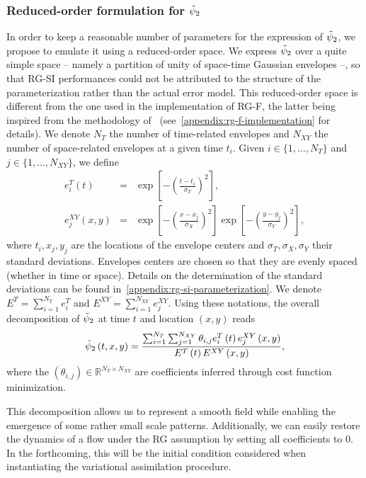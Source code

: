 \documentclass[
  draft
]{agujournal2025}
\begin{document}
\subsubsection{Reduced-order formulation for $\tilde{\sf}_2$}\label{sec:ROpsi2}
In order to keep a reasonable number of parameters for the expression of $\tilde{\sf}_2$, we propose to emulate it using a reduced-order space.
We express $\tilde{\sf}_2$ over a quite simple space -- namely a partition of unity of space-time Gaussian envelopes --, so that RG-SI performances could not be attributed to the structure of the parameterization rather than the actual error model. This reduced-order space is different from the one used in the implementation of RG-F, the latter being inspired from the methodology of~ (see~\ref{appendix:rg-f-implementation} for details).
We denote $N_T$ the number of time-related envelopes and $N_{XY}$ the number of space-related envelopes at a given time $t_i$. 
Given $i \in \{1,\dots,N_T\}$ and $j \in \{1,\dots,N_{XY}\}$, we define
\begin{eqnarray}
        e^T_{i}\left(t\right) & = & \exp\left[-{\left(\frac{t-t_i}{\sigma_T}\right)}^2\right], \\
        e^{XY}_{j}\left(x,y\right) & = &  \exp\left[-{\left(\frac{x-x_j}{\sigma_X}\right)}^2\right]\exp\left[-{\left(\frac{y-y_j}{\sigma_Y}\right)}^2\right],
\end{eqnarray}
where $t_i, x_j, y_j$ are the locations of the envelope centers and $\sigma_T, \sigma_X, \sigma_Y$ their standard deviations. Envelopes centers are chosen so that they are evenly spaced (whether in time or space). Details on the determination of the standard deviations can be found in~\ref{appendix:rg-si-parameterization}.
We denote $E^T = \sum_{i=1}^{N_T} e^T_i$ and $E^{XY} = \sum_{i=1}^{N_{XY}} e^{XY}_j$. Using these notations, the overall decomposition of $\tilde{\sf}_2$ at time $t$ and location $\left(x,y\right)$ reads
\begin{equation}
    \tilde{\sf}_2\left(t,x,y\right) = \frac{\sum_{i=1}^{N_T}\sum_{j=1}^{N_{XY}}  \theta_{i,j} e^T_{i}\left(t\right)e^{XY}_{j}\left(x,y\right)}{E^T\left(t\right) E^{XY}\left(x,y\right)},
\end{equation}
where the ${\left(\theta_{i,j}\right)} \in \mathbb{R}^{N_T \times N_{XY}}$ are coefficients inferred through cost function minimization. 

This decomposition allows us to represent a smooth field while enabling the emergence of some rather small scale patterns.
Additionally, we can easily restore the dynamics of a flow under the RG assumption by setting all coefficients to 0. 
In the forthcoming, this will be the initial condition considered when instantiating the variational assimilation procedure.
\end{document}
